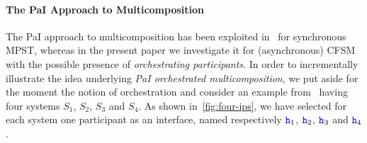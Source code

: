  
\noindent
\paragraph{The PaI Approach to Multicomposition}
\label{sec:pai-multicomp}
The PaI approach to multicomposition has been exploited in~\cite{BDGY23}
for synchronous MPST, whereas in the present paper 
we investigate it for (asynchronous) CFSM with the possible  presence of \emph{orchestrating participants}.
In order to incrementally illustrate the idea underlying \emph{PaI
  orchestrated multicomposition}, we put aside for the moment the notion of orchestration
and consider an example from~\cite{BDGY23} having four systems $S_1$,  $S_2$, $S_3$ and $S_4$.
As shown in~\cref{fig:four-ips}, we have selected for each system one participant
as an interface, named respectively ${\mathtt{\color{blue}{ {h}}}}_1$, ${\mathtt{\color{blue}{ {h}}}}_2$, ${\mathtt{\color{blue}{ {h}}}}_3$ and ${\mathtt{\color{blue}{ {h}}}}_4$.
 
